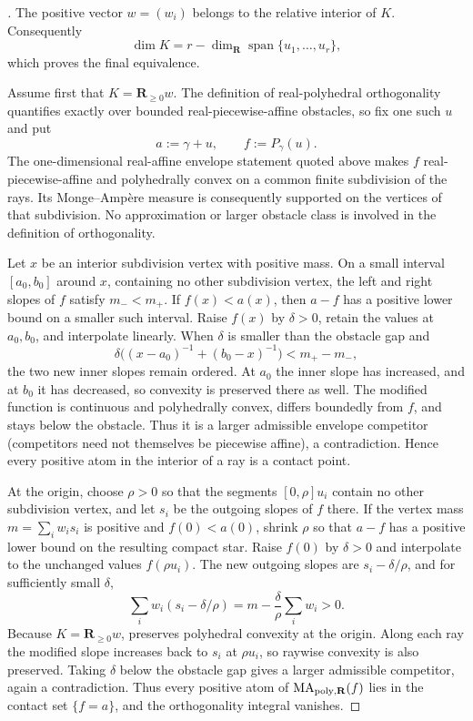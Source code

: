 \begin{proof}[]
The positive vector $w=(w_i)$ belongs to the relative interior of $K$.
Consequently
\[
 \dim K=r-\dim_{\mathbf R}\operatorname{span}\{u_1,\ldots,u_r\},
\]
which proves the final equivalence.

Assume first that $K=\mathbf R_{\geq0}w$.  The definition of
real-polyhedral orthogonality quantifies exactly over bounded
real-piecewise-affine obstacles, so fix one such
$u$ and put
\[
             a:=\gamma+u,
             \qquad f:=P_\gamma(u).
\]
The one-dimensional real-affine envelope statement quoted above makes $f$
real-piecewise-affine and polyhedrally convex on a common finite subdivision of
the rays.  Its Monge--Amp\`ere measure is consequently supported on the
vertices of that subdivision.  No approximation or larger obstacle class
is involved in the definition of orthogonality.

Let $x$ be an interior subdivision vertex with positive mass.  On a small
interval $[a_0,b_0]$ around $x$, containing no other subdivision vertex,
the left and right slopes of $f$ satisfy $m_-<m_+$.  If $f(x)<a(x)$,
then $a-f$ has a positive lower bound on a smaller such interval.  Raise
$f(x)$ by $\delta>0$, retain the values at $a_0,b_0$, and interpolate
linearly.  When $\delta$ is smaller than the obstacle gap and
\[
 \delta\bigl((x-a_0)^{-1}+(b_0-x)^{-1}\bigr)<m_+-m_-,
\]
the two new inner slopes remain ordered.  At $a_0$ the inner slope has
increased, and at $b_0$ it has decreased, so convexity is preserved there
as well.  The modified function is continuous and polyhedrally convex,
differs boundedly from $f$, and stays below the obstacle.  Thus it is a
larger admissible envelope competitor (competitors need not themselves be
piecewise affine), a contradiction.  Hence every positive atom in the
interior of a ray is a contact point.

At the origin, choose $\rho>0$ so that the segments
$[0,\rho]u_i$ contain no other subdivision vertex, and let $s_i$ be the
outgoing slopes of $f$ there.  If the vertex mass
$
 m=\sum_iw_i s_i
$
is positive and $f(0)<a(0)$, shrink $\rho$ so that $a-f$ has a
positive lower bound on the resulting compact star.  Raise $f(0)$ by
$\delta>0$ and interpolate to the unchanged values $f(\rho u_i)$.  The
new outgoing slopes are $s_i-\delta/\rho$, and for sufficiently small
$\delta$,
\[
 \sum_iw_i(s_i-\delta/\rho)
       =m-\frac{\delta}{\rho}\sum_iw_i>0.
\]
Because $K=\mathbf R_{\geq0}w$,
 preserves polyhedral
convexity at the origin.  Along each ray the modified slope increases back
to $s_i$ at $\rho u_i$, so raywise convexity is also preserved.  Taking
$\delta$ below the obstacle gap gives a larger admissible competitor,
again a contradiction.  Thus every positive atom of
$\operatorname{MA}_{\mathrm{poly},\mathbf R}(f)$ lies in the contact set $\{f=a\}$, and the
orthogonality integral vanishes.


\end{proof}
